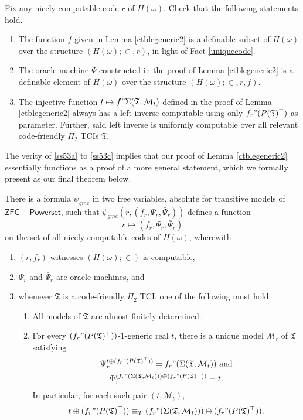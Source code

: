 \documentclass[12pt]{article}
\numberwithin{equation}{section}
\begin{document}
Fix any nicely computable code $r$ of $H(\omega)$. Check that the following statements hold.
\begin{enumerate}[label=(\Alph*)]
    \item\label{ss53a} The function $f$ given in Lemma \ref{ctblegeneric2} is a definable subset of $H(\omega)$ over the structure $(H(\omega); \in, r)$, in light of Fact \ref{uniquecode}.
    \item The oracle machine $\Psi$ constructed in the proof of Lemma \ref{ctblegeneric2} is a definable element of $H(\omega)$ over the structure $(H(\omega); \in, r, f)$.
    \item\label{ss53c} The injective function $t \mapsto f" \Sigma(\mathfrak{T}, \mathcal{M}_t)$ defined in the proof of Lemma \ref{ctblegeneric2} always has a left inverse computable using only $f_r" (P(\mathfrak{T})^{\top})$ as parameter. Further, said left inverse is uniformly computable over all relevant code-friendly $\Pi_2$ TCIs $\mathfrak{T}$.
\end{enumerate}
The verity of \ref{ss53a} to \ref{ss53c} implies that our proof of Lemma \ref{ctblegeneric2} essentially functions as a proof of a more general statement, which we formally present as our final theorem below.

\begin{thm}\label{lastthm}
There is a formula $\psi_{gmc}$ in two free variables, absolute for transitive models of $\mathsf{ZFC - Powerset}$, such that $\psi_{gmc}(r, (f_r, \Psi_r, \bar{\Psi}_{r}))$ defines a function $$r \mapsto (f_r, \Psi_r, \bar{\Psi}_{r})$$ on the set of all nicely computable codes of $H(\omega)$, wherewith
\begin{enumerate}[label=(\arabic*)]
    \item $(r, f_r)$ witnesses $(H(\omega); \in)$ is computable,
    \item $\Psi_r$ and $\bar{\Psi}_{r}$ are oracle machines, and
    \item whenever $\mathfrak{T}$ is a code-friendly $\Pi_2$ TCI, one of the following must hold:
    \begin{enumerate}[label=(\alph*)]
        \item All models of $\mathfrak{T}$ are almost finitely determined.
        \item For every $(f_r" (P(\mathfrak{T})^{\top}))$-$1$-generic real $t$, there is a unique model $\mathcal{M}_t$ of $\mathfrak{T}$ satisfying 
        \begin{gather*}
            \Psi_r^{t \oplus (f_r" (P(\mathfrak{T})^{\top}))} = f_r" (\Sigma(\mathfrak{T}, \mathcal{M}_t)) \text{ and} \\
            \bar{\Psi}_{r}^{(f_r" (\Sigma(\mathfrak{T}, \mathcal{M}_t))) \oplus (f_r" (P(\mathfrak{T})^{\top}))} = t.
        \end{gather*}
        In particular, for each such pair $(t, \mathcal{M}_t)$, $$t \oplus (f_r" (P(\mathfrak{T})^{\top})) \equiv_{T} (f_r" (\Sigma(\mathfrak{T}, \mathcal{M}_t))) \oplus (f_r" (P(\mathfrak{T})^{\top})).$$
\end{enumerate}
\end{enumerate}
\end{thm}
\end{document}
